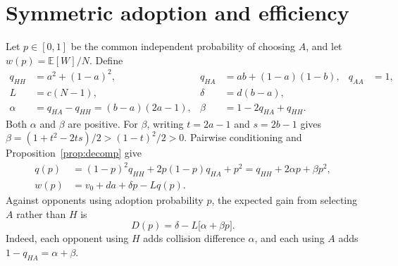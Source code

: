 \documentclass[11pt,a4paper]{article}
\theoremstyle{definition}
\theoremstyle{remark}
\newcommand{\E}{\mathbb E}
\begin{document}
\section{Symmetric adoption and efficiency}
Let $p\in[0,1]$ be the common independent probability of choosing $A$, and let $w(p)=\E[W]/N$. Define
\begin{align}
 q_{HH}&=a^2+(1-a)^2,&q_{HA}&=ab+(1-a)(1-b),&q_{AA}&=1,\label{eq:pairs}\\
 L&=c(N-1),&\delta&=d(b-a),\\
 \alpha&=q_{HA}-q_{HH}=(b-a)(2a-1),&
 \beta&=1-2q_{HA}+q_{HH}.\label{eq:constants}
\end{align}
Both $\alpha$ and $\beta$ are positive. For $\beta$, writing $t=2a-1$ and $s=2b-1$ gives $\beta=(1+t^2-2ts)/2>(1-t)^2/2>0$.
Pairwise conditioning and Proposition~\ref{prop:decomp} give
\begin{align}
 q(p)&=(1-p)^2q_{HH}+2p(1-p)q_{HA}+p^2
      =q_{HH}+2\alpha p+\beta p^2,\label{eq:q}\\
 w(p)&=v_0+da+\delta p-Lq(p).\label{eq:w}
\end{align}
Against opponents using adoption probability $p$, the expected gain from selecting $A$ rather than $H$ is
\begin{equation}\label{eq:gain}
 D(p)=\delta-L\bigl[\alpha+\beta p\bigr].
\end{equation}
Indeed, each opponent using $H$ adds collision difference $\alpha$, and each using $A$ adds $1-q_{HA}=\alpha+\beta$.
\end{document}
